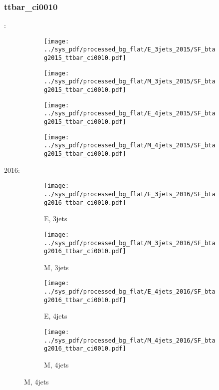 \documentclass{beamer}
\begin{document}
\begin{frame}
\frametitle{ttbar_ci0010}
\fontsize{5}{1}:
\begin{figure}
\centering
\begin{subfigure}[b]{0.24\textwidth}
\texttt{[image: ../sys\_pdf/processed\_bg\_flat/E\_3jets\_2015/SF\_btag2015\_ttbar\_ci0010.pdf]}
\end{subfigure}
\begin{subfigure}[b]{0.24\textwidth}
\texttt{[image: ../sys\_pdf/processed\_bg\_flat/M\_3jets\_2015/SF\_btag2015\_ttbar\_ci0010.pdf]}
\end{subfigure}
\begin{subfigure}[b]{0.24\textwidth}
\texttt{[image: ../sys\_pdf/processed\_bg\_flat/E\_4jets\_2015/SF\_btag2015\_ttbar\_ci0010.pdf]}
\end{subfigure}
\begin{subfigure}[b]{0.24\textwidth}
\texttt{[image: ../sys\_pdf/processed\_bg\_flat/M\_4jets\_2015/SF\_btag2015\_ttbar\_ci0010.pdf]}
\end{subfigure}
\end{figure}
2016:
\begin{figure}
\centering
\begin{subfigure}[b]{0.24\textwidth}
\texttt{[image: ../sys\_pdf/processed\_bg\_flat/E\_3jets\_2016/SF\_btag2016\_ttbar\_ci0010.pdf]}
\captionsetup{font=tiny}
\caption{E, 3jets}
\end{subfigure}
\begin{subfigure}[b]{0.24\textwidth}
\texttt{[image: ../sys\_pdf/processed\_bg\_flat/M\_3jets\_2016/SF\_btag2016\_ttbar\_ci0010.pdf]}
\captionsetup{font=tiny}
\caption{M, 3jets}
\end{subfigure}
\begin{subfigure}[b]{0.24\textwidth}
\texttt{[image: ../sys\_pdf/processed\_bg\_flat/E\_4jets\_2016/SF\_btag2016\_ttbar\_ci0010.pdf]}
\captionsetup{font=tiny}
\caption{E, 4jets}
\end{subfigure}
\begin{subfigure}[b]{0.24\textwidth}
\texttt{[image: ../sys\_pdf/processed\_bg\_flat/M\_4jets\_2016/SF\_btag2016\_ttbar\_ci0010.pdf]}
\captionsetup{font=tiny}
\caption{M, 4jets}
\end{subfigure}
\end{figure}
\end{frame}
\end{document}

